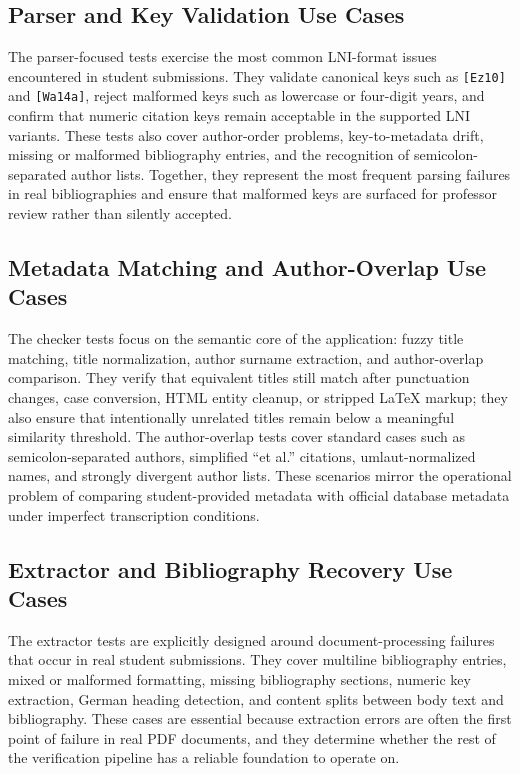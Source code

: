 \documentclass[12pt,a4paper,oneside]{report}
\begin{document}
\subsection{Parser and Key Validation Use Cases}
The parser-focused tests exercise the most common LNI-format issues encountered in student submissions. They validate canonical keys such as \texttt{[Ez10]} and \texttt{[Wa14a]}, reject malformed keys such as lowercase or four-digit years, and confirm that numeric citation keys remain acceptable in the supported LNI variants. These tests also cover author-order problems, key-to-metadata drift, missing or malformed bibliography entries, and the recognition of semicolon-separated author lists. Together, they represent the most frequent parsing failures in real bibliographies and ensure that malformed keys are surfaced for professor review rather than silently accepted.

\subsection{Metadata Matching and Author-Overlap Use Cases}
The checker tests focus on the semantic core of the application: fuzzy title matching, title normalization, author surname extraction, and author-overlap comparison. They verify that equivalent titles still match after punctuation changes, case conversion, HTML entity cleanup, or stripped LaTeX markup; they also ensure that intentionally unrelated titles remain below a meaningful similarity threshold. The author-overlap tests cover standard cases such as semicolon-separated authors, simplified ``et al.'' citations, umlaut-normalized names, and strongly divergent author lists. These scenarios mirror the operational problem of comparing student-provided metadata with official database metadata under imperfect transcription conditions.

\subsection{Extractor and Bibliography Recovery Use Cases}
The extractor tests are explicitly designed around document-processing failures that occur in real student submissions. They cover multiline bibliography entries, mixed or malformed formatting, missing bibliography sections, numeric key extraction, German heading detection, and content splits between body text and bibliography. These cases are essential because extraction errors are often the first point of failure in real PDF documents, and they determine whether the rest of the verification pipeline has a reliable foundation to operate on.
\end{document}
